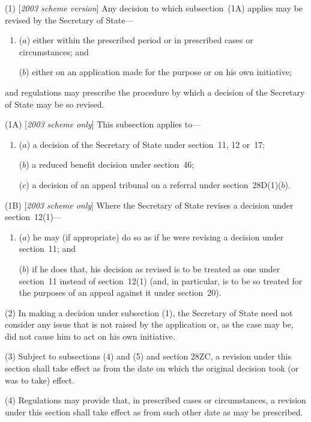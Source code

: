 \documentclass[12pt,a4paper]{article}
\begin{document}
(1) [\emph{2003 scheme version}] Any decision 
to which subsection~(1A)  applies  %
may be revised by the Secretary of State—
\begin{enumerate}\item[]
($a$) either within the prescribed period or in prescribed cases or circumstances; and

($b$) either on an application made for the purpose or on his own initiative;
\end{enumerate}
and regulations may prescribe the procedure by which a decision of the Secretary of State may be so revised.

(1A) [\emph{2003 scheme only}] This subsection applies to—
\begin{enumerate}\item[]
($a$) a decision of the Secretary of State under section~11, 12 or~17;

($b$) a reduced benefit decision under section~46;

($c$) a decision of an appeal tribunal on a referral under section~28D(1)($b$).
\end{enumerate}

(1B) [\emph{2003 scheme only}] Where the Secretary of State revises a decision under section~12(1)—
\begin{enumerate}\item[]
($a$) he may (if appropriate) do so as if he were revising a decision under section~11; and

($b$) if he does that, his decision as revised is to be treated as one under section~11 instead of section~12(1)  (and, in particular, is to be so treated for the purposes of an appeal against it under section~20).
\end{enumerate}

(2) In making a decision under subsection (1), the Secretary of State need not consider any issue that is not raised by the application or, as the case may be, did not cause him to act on his own initiative.

(3) Subject to subsections (4) and (5) and section 28ZC, a revision under this section shall take effect as from the date on which the original decision took (or was to take) effect.

(4) Regulations may provide that, in prescribed cases or circumstances, a revision under this section shall take effect as from such other date as may be prescribed.
\end{document}
